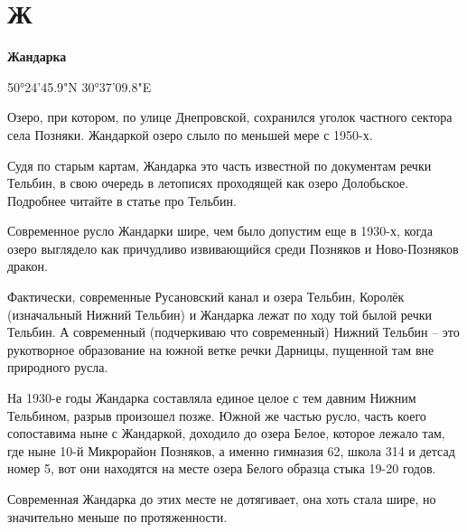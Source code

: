 \chapter*{Ж}

\textbf{Жандарка}

50°24'45.9"N 30°37'09.8"E

Озеро, при котором, по улице Днепровской, сохранился уголок частного сектора села Позняки. Жандаркой озеро слыло по меньшей мере с 1950-х.

Судя по старым картам, Жандарка это часть известной по документам речки Тельбин, в свою очередь в летописях проходящей как озеро Долобьское. Подробнее читайте в статье про Тельбин.

Современное русло Жандарки шире, чем было допустим еще в 1930-х, когда озеро выглядело как причудливо извивающийся среди Позняков и Ново-Позняков дракон.

Фактически, современные Русановский канал и озера Тельбин, Королёк (изначальный Нижний Тельбин) и Жандарка лежат по ходу той былой речки Тельбин. А современный (подчеркиваю что современный) Нижний Тельбин – это рукотворное образование на южной ветке речки Дарницы, пущенной там вне природного русла.

На 1930-е годы Жандарка составляла единое целое с тем давним Нижним Тельбином, разрыв произошел позже. Южной же частью русло, часть коего сопоставима ныне с Жандаркой, доходило до озера Белое, которое лежало там, где ныне 10-й Микрорайон Позняков, а именно гимназия 62, школа 314 и детсад номер 5, вот они находятся на месте озера Белого образца стыка 19-20 годов.

Современная Жандарка до этих месте не дотягивает, она хоть стала шире, но значительно меньше по протяженности.